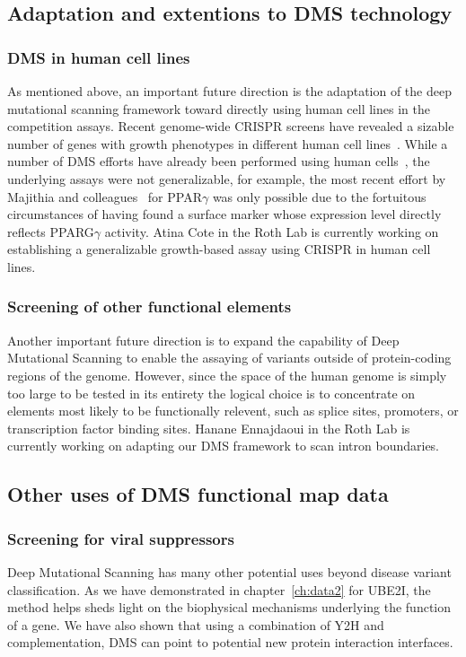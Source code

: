 \subsection{Adaptation and extentions to DMS technology}
\subsubsection{DMS in human cell lines}
As mentioned above, an important future direction is the adaptation of the deep mutational scanning framework toward directly using human cell lines in the competition assays. Recent genome-wide CRISPR screens have revealed a sizable number of genes with growth phenotypes in different human cell lines~\cite{hart_high-resolution_2015,blomen_gene_2015,wang_genetic_2014}. While a number of DMS efforts have already been performed using human cells~\cite{forsyth_deep_2013,wagenaar_resistance_2014,doud_site-specific_2015,majithia_prospective_2016}, the underlying assays were not generalizable, for example, the most recent effort by Majithia and colleagues~\cite{majithia_prospective_2016} for PPAR$\gamma$ was only possible due to the fortuitous circumstances of having found a surface marker whose expression level directly reflects PPARG$\gamma$ activity. 
Atina Cote in the Roth Lab is currently working on establishing a generalizable growth-based assay using CRISPR in human cell lines. 

\subsubsection{Screening of other functional elements}
Another important future direction is to expand the capability of Deep Mutational Scanning to enable the assaying of variants outside of protein-coding regions of the genome. However, since the space of the human genome is simply too large to be tested in its entirety the logical choice is to concentrate on elements most likely to be functionally relevent, such as splice sites, promoters, or transcription factor binding sites.
Hanane Ennajdaoui in the Roth Lab is currently working on adapting our DMS framework to scan intron boundaries.

\subsection{Other uses of DMS functional map data}

\subsubsection{Screening for viral suppressors}
Deep Mutational Scanning has many other potential uses beyond disease variant classification. As we have demonstrated in chapter~\ref{ch:data2} for UBE2I, the method helps sheds light on the biophysical mechanisms underlying the function of a gene. We have also shown that using a combination of Y2H and complementation, DMS can point to potential new protein interaction interfaces. 

